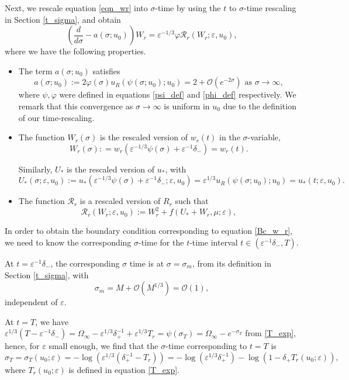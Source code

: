\documentclass[letterpaper,11pt]{article}
\newcommand{\Ral}{\mathcal{R}}
\newcommand{\rmO}{\mathcal{O}}
\newcommand{\eps}{\varepsilon}
\numberwithin{equation}{section}
\theoremstyle{plain}
\begin{document}
Next, we rescale equation \eqref{eqn_wr} into $\sigma$-time by using the $t$ to $\sigma$-time rescaling in Section \ref{t_sigma}, and obtain
\begin{equation}\label{rescl_wr}
\left(\frac{d}{d\sigma} - a(\sigma; u_0)\right) W_r =\eps^{-1/3}\varphi \mathcal{R}_r(W_r; \eps,u_0),
\end{equation}
where we have the following properties.
\begin{itemize}
\item The term $a(\sigma; u_0)$ satisfies
\begin{equation}\label{asy:a}
a(\sigma; u_0) := 2\varphi(\sigma)u_R(\psi(\sigma; u_0); u_0) =  2+\rmO(e^{-2\sigma}) \text{ as }\sigma \to \infty,
\end{equation}
where $\psi, \varphi$ were defined in equations \eqref{psi_def} and \eqref{phi_def} respectively. We remark that this convergence as $\sigma \to \infty$ is uniform in $u_0$ due to the definition of our time-rescaling.

\item The function $W_r(\sigma)$ is the rescaled version of $w_r(t)$ in the $\sigma$-variable, 
\[
W_r(\sigma): = w_r(\eps^{-1/3}\psi(\sigma)+\eps^{-1}\delta_-) = w_r(t) .
\] 

Similarly, $U_*$ is the rescaled version of $u_*$, with 
\[
U_*(\sigma;\eps,u_0) :=u_*(\eps^{-1/3}\psi(\sigma)+\eps^{-1}\delta_-;\eps,u_0)= \eps^{1/3}u_R(\psi(\sigma;u_0);u_0) = u_*(t;\eps,u_0).
\]

\item The function $\Ral_r$ is a rescaled version of $R_r$ such that 
\[
\mathcal{R}_r(W_r;\eps,u_0) := W_r^2 + f(U_*+W_r, \mu ; \eps),
\]
\end{itemize}
 
In order to obtain the boundary condition corresponding to equation \eqref{Bc_w_r}, we need to know the corresponding $\sigma$-time for the $t$-time interval $t\in (\eps^{-1}\delta_-, T)$.

At $t = \eps^{-1}\delta_-$, the corresponding $\sigma$ time is at $\sigma=\sigma_m$, from its definition in Section \ref{t_sigma}, with
\[
\sigma_m = M + \rmO(M^{1/3}) = \rmO(1),
\]
independent of $\eps$.

At $t=T$, we have $\eps^{1/3}(T-\eps^{-1}\delta_-) = \Omega_\infty -\eps^{1/3}\delta_+^{-1}+\eps^{1/3}T_r=\psi(\sigma_T) = \Omega_\infty-e^{-\sigma_T}$ from \eqref{T_exp}, hence, for $\eps$ small enough, we find that the $\sigma$-time corresponding to $t=T$ is 
\begin{equation}\label{def_sigm_T}
\sigma_T=\sigma_T(u_0;\eps) = -\log(\eps^{1/3}(\delta_+^{-1}-T_r)) = -\log(\eps^{1/3}\delta_+^{-1}) - \log(1-\delta_+ T_r(u_0;\eps)),
\end{equation}
where $T_r(u_0;\eps)$ is defined in equation \eqref{T_exp}.
\end{document}
